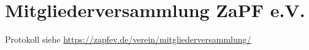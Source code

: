 
\section{Mitgliederversammlung ZaPF e.V.}

Protokoll siehe \url{https://zapfev.de/verein/mitgliederversammlung/}


